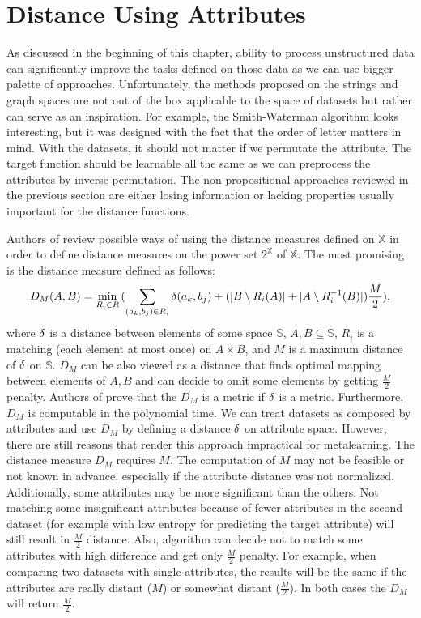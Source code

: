 \section{Distance Using Attributes}
\label{section:distanceUsingAttributes}
As discussed in the beginning of this chapter, ability to process unstructured data can significantly improve the tasks defined on those data as we can use bigger palette of approaches. Unfortunately, the methods proposed on the strings and graph spaces are not out of the box applicable to the space of datasets but rather can serve as an inspiration. For example, the Smith-Waterman algorithm looks interesting, but it was designed with the fact that the order of letter matters in mind. With the datasets, it should not matter if we permutate the attribute. The target function should be learnable all the same as we can preprocess the attributes by inverse permutation. The non-propositional approaches reviewed in the previous section are either losing information or lacking properties usually important for the distance functions.

Authors of \cite{DistancesAndIndefiniteKernelsForTheSetsOfObjects} review possible ways of using the distance measures defined on $\mathbb{X}$ in
order to define distance measures on the power set $2^\mathbb{X}$ of $\mathbb{X}.$
The most promising is the distance measure defined as follows:
\begin{equation}
D_M(A,B) = \min_{R_i \in R}{(\sum_{(a_k, b_j) \in R_i}{\delta(a_k, b_j)}+(|B \setminus R_i(A)|+|A \setminus R_i^{-1}(B)|)\frac{M}{2})},
\end{equation}
where $\delta$ is a distance between elements of some space $\mathbb{S}$, $A,B \subseteq \mathbb{S}$, $R_i$ is a matching (each element at most once) on $A \times B$, and $M$ is a maximum distance of $\delta$ on $\mathbb{S}$. $D_M$ can be also viewed as a distance that finds optimal mapping between elements of $A,B$ and can decide to omit some elements by getting $\frac{M}{2}$ penalty.
Authors of  \cite{polynomialTimeComputableMetricBetweenPointSets} prove that the $D_M$ is a metric if $\delta$ is a metric. Furthermore, $D_M$ is computable in the polynomial time.
We can treat datasets as composed by attributes and use $D_M$ by defining a distance $\delta$ on attribute space. However, there are still reasons that render this approach impractical for metalearning.
The distance measure $D_M$ requires $M$. The computation of $M$ may not be feasible or not known in advance, especially if the attribute distance was not normalized. Additionally, some attributes may be more significant than the others. Not matching some insignificant attributes because of fewer attributes in the second dataset (for example with low entropy for predicting the target attribute) will still result in $\frac{M}{2}$ distance. Also, algorithm can decide not to match some attributes with high difference and get only $\frac{M}{2}$ penalty. For example, when comparing two datasets with single attributes, the results will be the same if the attributes are really distant ($M$) or somewhat distant ($\frac{M}{2}$). In both cases the $D_M$ will return $\frac{M}{2}$.

